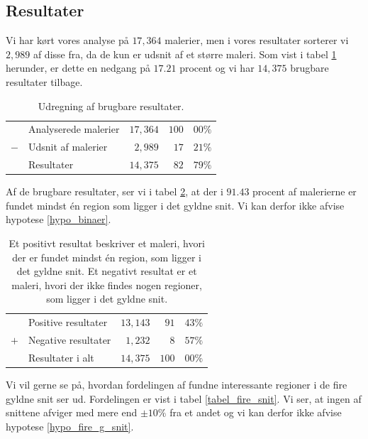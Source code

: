 {\clearpage

\subsection{Resultater}
Vi har kørt vores analyse på $17,364$ malerier, men i vores resultater
sorterer vi $2,989$ af disse fra, da de kun er udsnit af et større maleri.
Som vist i tabel \ref{tabel_fjern_detaljer} herunder, er dette en nedgang
på $17.21$ procent og vi har $14,375$ brugbare resultater tilbage.

\begin{table}[H]
    \centering
    \begin{tabular}{r@{\ \ }p{12em}r|r@{.}l}
            & Analyserede malerier & $17,364$ & $100$ & $00\%$   \\
        $-$ & Udsnit af malerier   &  $2,989$ &  $17$ & $21\%$   \\\hline
            & Resultater           & $14,375$ &  $82$ & $79\%$
    \end{tabular}
    \caption[]{Udregning af brugbare resultater.}
    \label{tabel_fjern_detaljer}
\end{table}

Af de brugbare resultater, ser vi i tabel \ref{tabel_fordeling}, at der
i $91.43$ procent af malerierne er fundet mindst én region som ligger i
det gyldne snit. Vi kan derfor ikke afvise hypotese \ref{hypo_binaer}.

\begin{table}[H]
    \centering
    \begin{tabular}{r@{\ \ }p{12em}r|r@{.}l}
            & Positive resultater   & $13,143$ &  $91$ & $43\%$ \\
        $+$ & Negative resultater   &  $1,232$ &   $8$ & $57\%$ \\\hline
            & Resultater i alt      & $14,375$ & $100$ & $00\%$
    \end{tabular}
    \caption[]{Et positivt resultat beskriver et maleri, hvori der er
    fundet mindst én region, som ligger i det gyldne snit. Et negativt
    resultat er et maleri, hvori der ikke findes nogen regioner, som
    ligger i det gyldne snit.}
    \label{tabel_fordeling}
\end{table}

Vi vil gerne se på, hvordan fordelingen af fundne interessante regioner i
de fire gyldne snit ser ud. Fordelingen er vist i tabel
\ref{tabel_fire_snit}. Vi ser, at ingen af snittene afviger med mere end
$\pm10\%$ fra et andet og vi kan derfor ikke afvise hypotese
\ref{hypo_fire_g_snit}.

}
